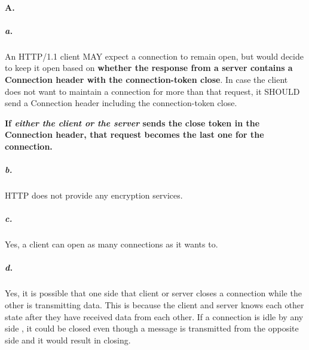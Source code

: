 \paragraph{A.}
\subparagraph{a. }
An HTTP/1.1 client MAY expect a connection to remain open, but would
decide to keep it open based on \textbf{whether the response from a server contains a Connection header with the connection-token close}. In case the client does not want to maintain a connection for more than that request, it SHOULD send a Connection header including the
connection-token close.

\textbf{If \textit{either the client or the server} sends the close token in the
Connection header, that request becomes the last one for the
connection.}

\subparagraph{b.}
HTTP does not provide any encryption services.

\subparagraph{c.}
Yes, a client can open as many connections as it wants to.

\subparagraph{d.}
Yes, it is possible that one side that client or server closes a connection while the other is transmitting data. This is because the client and server knows each other state after they have received data from each other. If a connection is idle by any side , it could be closed even though a message is transmitted from the opposite side and it would result in closing.